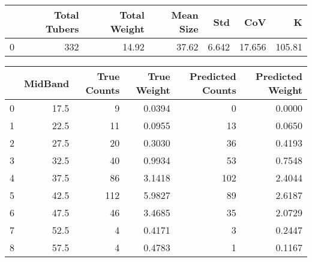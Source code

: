 \begin{tabular}{lrrrrrr}
\toprule
{} &  Total Tubers &  Total Weight &  Mean Size &    Std &     CoV &       K \\
\midrule
0 &           332 &         14.92 &      37.62 &  6.642 &  17.656 &  105.81 \\
\bottomrule
\end{tabular}

\begin{tabular}{lrrrrr}
\toprule
{} &  MidBand &  True Counts &  True Weight &  Predicted Counts &  Predicted Weight \\
\midrule
0 &     17.5 &            9 &       0.0394 &                 0 &            0.0000 \\
1 &     22.5 &           11 &       0.0955 &                13 &            0.0650 \\
2 &     27.5 &           20 &       0.3030 &                36 &            0.4193 \\
3 &     32.5 &           40 &       0.9934 &                53 &            0.7548 \\
4 &     37.5 &           86 &       3.1418 &               102 &            2.4044 \\
5 &     42.5 &          112 &       5.9827 &                89 &            2.6187 \\
6 &     47.5 &           46 &       3.4685 &                35 &            2.0729 \\
7 &     52.5 &            4 &       0.4171 &                 3 &            0.2447 \\
8 &     57.5 &            4 &       0.4783 &                 1 &            0.1167 \\
\bottomrule
\end{tabular}
